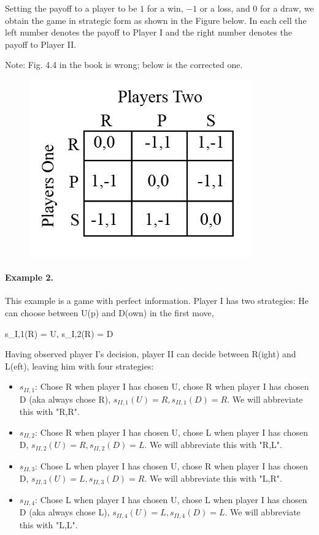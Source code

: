 Setting the payoff to a player to be $1$ for a win, $-1$ or a loss, and $0$ for a draw, we obtain the game in strategic form as shown in the Figure below. In each cell the left number denotes the payoff to Player I and the right number denotes the payoff to Player II.

Note: Fig. 4.4 in the book \cite{Maschler2013} is wrong; below is the corrected one.

\begin{figure}[H]
    \centering
    \includegraphics[scale=0.7]{images/2023-10-10-game_theory_06.png}
\end{figure}



\paragraph{Example 2.} This example is a game with perfect information. Player I has two strategies: He can choose between U(p) and D(own) in the first move,

\bee
s_{I,1}(R) = U, \quad s_{I,2}(R) = D
\eee

Having observed player I's decision, player II can decide between R(ight) and L(eft), leaving him with four strategies:

\begin{itemize}
	\item $s_{II,1}$: Chose R when player I has chosen U, chose R when player I has chosen D (aka always chose R), $s_{II,1}(U) = R, s_{II,1}(D) = R$. We will abbreviate this with "R,R".
	\item $s_{II,2}$: Chose R when player I has chosen U, chose L when player I has chosen D, $s_{II,2}(U) = R, s_{II,2}(D) = L$. We will abbreviate this with "R,L".
	\item $s_{II,3}$: Chose L when player I has chosen U, chose R when player I has chosen D, $s_{II,3}(U) = L, s_{II,3}(D) = R$. We will abbreviate this with "L,R".
	\item $s_{II,4}$: Chose L when player I has chosen U, chose L when player I has chosen D (aka always chose L), $s_{II,4}(U) = L, s_{II,4}(D) = L$. We will abbreviate this with "L,L".
\end{itemize}

